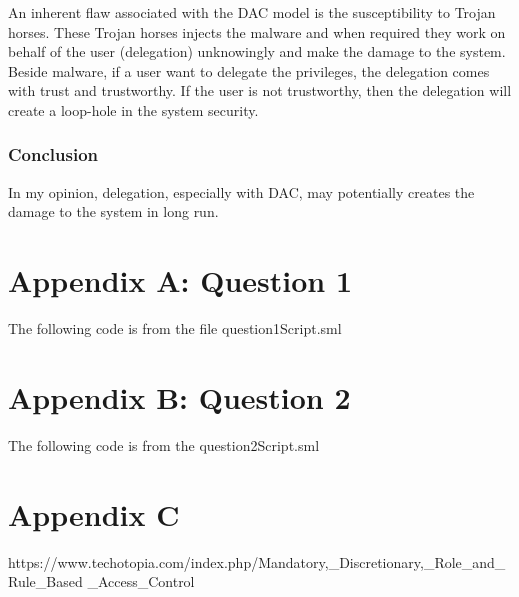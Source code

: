 \documentclass{report}
\begin{document}
An inherent flaw associated with the DAC model is the susceptibility to Trojan horses. 
These Trojan horses injects the malware and when required they work on behalf of the user (delegation) unknowingly and make the damage to the system. 
Beside malware, if a user want to delegate the privileges, the delegation comes with trust and trustworthy. 
If the user is not trustworthy, then the delegation will create a loop-hole in the system security. 


\subsection{Conclusion}
\label{sec:conclusion-3}
In my opinion, delegation, especially with DAC, may potentially creates the damage to the system in long run.

\chapter{Appendix A: Question 1}
\label{cha:appendix-a:1}

The following code is from the file question1Script.sml


\chapter{Appendix B: Question 2 }
\label{cha:appendix-b:2}

The following code is from the question2Script.sml


\chapter{Appendix C}
\label{cha:appendix-c:3}
https://www.techotopia.com/index.php/Mandatory,_Discretionary,_Role_and_Rule_Based
_Access_Control
\end{document}
